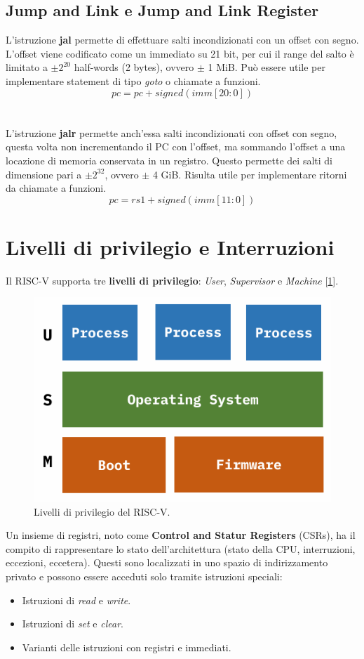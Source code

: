 \subsection{Jump and Link e Jump and Link Register}
L'istruzione \textbf{jal} permette di effettuare salti incondizionati con un offset con segno. L'offset viene codificato come un immediato su 21 bit, per cui il range del salto è limitato a \(\pm2^{20}\) half-words (2 bytes), ovvero \(\pm\) 1 MiB. Può essere utile per implementare statement di tipo \textit{goto} o chiamate a funzioni.
\[pc=pc+signed(imm[20:0])\]
\\
\\
L'istruzione \textbf{jalr} permette anch'essa salti incondizionati con offset con segno, questa volta non incrementando il PC con l'offset, ma sommando l'offset a una locazione di memoria conservata in un registro. Questo permette dei salti di dimensione pari a \(\pm2^{32}\), ovvero \(\pm\) 4 GiB. Risulta utile per implementare ritorni da chiamate a funzioni.
\[pc=rs1+signed(imm[11:0])\]

\section{Livelli di privilegio e Interruzioni}
Il RISC-V supporta tre \textbf{livelli di privilegio}: \textit{User}, \textit{Supervisor} e \textit{Machine} [\ref{fig:risc-v-privilege}].
\begin{figure}[!h]
	\centering
	\includegraphics[width=0.3\linewidth]{img/risc-v-privilege}
	\caption{Livelli di privilegio del RISC-V.}
	\label{fig:risc-v-privilege}
\end{figure}
Un insieme di registri, noto come \textbf{Control and Statur Registers} (CSRs), ha il compito di rappresentare lo stato dell'architettura (stato della CPU, interruzioni, eccezioni, eccetera). Questi sono localizzati in uno spazio di indirizzamento privato e possono essere acceduti solo tramite istruzioni speciali:
\begin{itemize}
	\item Istruzioni di \textit{read} e \textit{write}.
	\item Istruzioni di \textit{set} e \textit{clear}.
	\item Varianti delle istruzioni con registri e immediati.
\end{itemize}

